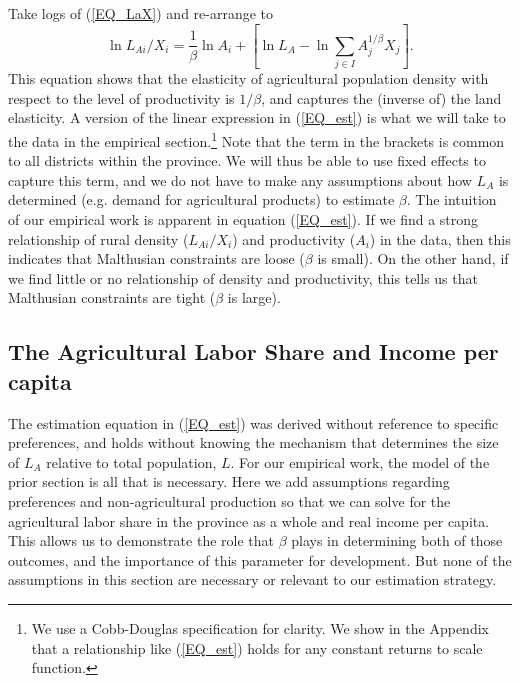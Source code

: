 \documentclass[11pt]{article}
\begin{document}
Take logs of (\ref{EQ_LaX}) and re-arrange to
\begin{equation}
\ln L_{Ai}/X_i = \frac{1}{\beta} \ln A_{i} + \left[\ln L_A - \ln \sum_{j\in I} A_{j}^{1/\beta}X_{j} \right]. \label{EQ_est}
\end{equation}
This equation shows that the elasticity of agricultural population density with respect to the level of productivity is $1/\beta$, and captures the (inverse of) the land elasticity. A version of the linear expression in (\ref{EQ_est}) is what we will take to the data in the empirical section.\footnote{We use a Cobb-Douglas specification for clarity. We show in the Appendix that a relationship like (\ref{EQ_est}) holds for any constant returns to scale function.} Note that the term in the brackets is common to all districts within the province. We will thus be able to use fixed effects to capture this term, and we do not have to make any assumptions about how $L_A$ is determined (e.g. demand for agricultural products) to estimate $\beta$. The intuition of our empirical work is apparent in equation (\ref{EQ_est}). If we find a strong relationship of rural density ($L_{Ai}/X_i$) and productivity ($A_i$) in the data, then this indicates that Malthusian constraints are loose ($\beta$ is small). On the other hand, if we find little or no relationship of density and productivity, this tells us that Malthusian constraints are tight ($\beta$ is large). 

\subsection{The Agricultural Labor Share and Income per capita}
The estimation equation in (\ref{EQ_est}) was derived without reference to specific preferences, and holds without knowing the mechanism that determines the size of $L_A$ relative to total population, $L$. For our empirical work, the model of the prior section is all that is necessary. Here we add assumptions regarding preferences and non-agricultural production so that we can solve for the agricultural labor share in the province as a whole and real income per capita. This allows us to demonstrate the role that $\beta$ plays in determining both of those outcomes, and the importance of this parameter for development. But none of the assumptions in this section are necessary or relevant to our estimation strategy.
\end{document}
